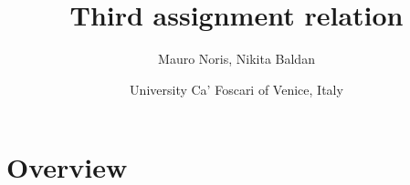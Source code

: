 \documentclass[11pt]{article}
\title{\textbf{Third assignment relation}}
\author{Mauro Noris, Nikita Baldan}
\date{University Ca' Foscari of Venice, Italy}
\begin{document}
\maketitle

\section{Overview}
\end{document}
